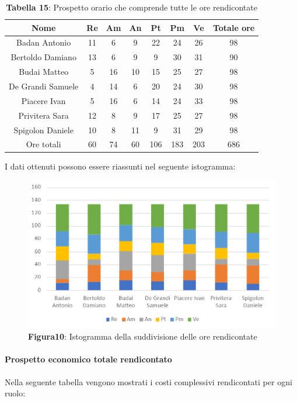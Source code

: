 \begin{table}[H]
	\centering
	\renewcommand{\arraystretch}{1.5}
	\begin{tabular}{|c|c|c|c|c|c|c|c|}
		\hline
		\rowcolor{lighter-grayer}
		Nome & Re & Am & An & Pt & Pm & Ve & Totale ore\\
		\hline
		Badan Antonio & 11 & 6 & 9 & 22 & 24 & 26 & 98 \\
		\hline
		Bertoldo Damiano & 13 & 6 & 9 & 9 & 30 & 31 & 90 \\
		\hline
		Budai Matteo & 5 & 16 & 10 & 15 & 25 & 27 & 98 \\
		\hline
		De Grandi Samuele & 4 & 14 & 6 & 20 & 24 & 30 & 98 \\
		\hline
		Piacere Ivan & 5 & 16 & 6 & 14 & 24 & 33 & 98 \\
		\hline
		Privitera Sara & 12 & 8 & 9 & 17 & 25 & 27 & 98 \\
		\hline
		Spigolon Daniele & 10 & 8 & 11 & 9 & 31 & 29 & 98 \\
		\hline
		Ore totali & 60 & 74 & 60 & 106 & 183 & 203 & 686 \\
		\hline
	\end{tabular}
	\caption*{\textbf{Tabella 15}: Prospetto orario che comprende tutte le ore rendicontate\\}
\end{table}	
I dati ottenuti possono essere riassunti nel seguente istogramma:

\begin{figure}[H]
	\centering
	\includegraphics[width=0.7\linewidth]{res/images/IstogrammaTotaleRendicontato.png}
	\caption*{\textbf{Figura10}: Istogramma della suddivisione delle ore rendicontate}
	\label{fig:Figura10}
\end{figure}

\paragraph{Prospetto economico totale rendicontato}
Nella seguente tabella vengono mostrati i costi complessivi rendicontati per ogni ruolo:


